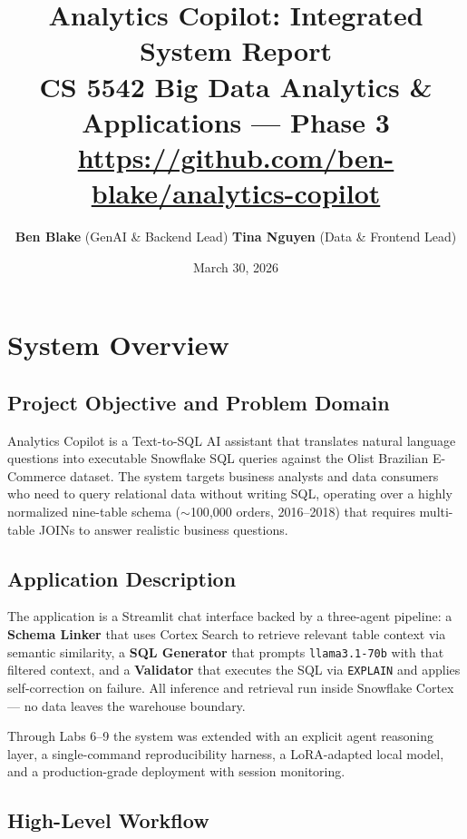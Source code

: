 \documentclass[11pt,letterpaper]{article}
\title{\vspace{-1.2cm}\textbf{Analytics Copilot: Integrated System Report}\\[3pt]
\large CS 5542 Big Data Analytics \& Applications --- Phase 3\\[2pt]
\normalsize \url{https://github.com/ben-blake/analytics-copilot}}
\author{\textbf{Ben Blake} (GenAI \& Backend Lead) \quad
\textbf{Tina Nguyen} (Data \& Frontend Lead)}
\date{March 30, 2026}
\begin{document}
\maketitle
\vspace{-0.6cm}

\section{System Overview}

\subsection{Project Objective and Problem Domain}

Analytics Copilot is a Text-to-SQL AI assistant that translates natural language questions into executable Snowflake SQL queries against the Olist Brazilian E-Commerce dataset. The system targets business analysts and data consumers who need to query relational data without writing SQL, operating over a highly normalized nine-table schema ($\sim$100{,}000 orders, 2016--2018) that requires multi-table JOINs to answer realistic business questions.

\subsection{Application Description}

The application is a Streamlit chat interface backed by a three-agent pipeline: a \textbf{Schema Linker} that uses Cortex Search to retrieve relevant table context via semantic similarity, a \textbf{SQL Generator} that prompts \texttt{llama3.1-70b} with that filtered context, and a \textbf{Validator} that executes the SQL via \texttt{EXPLAIN} and applies self-correction on failure. All inference and retrieval run inside Snowflake Cortex --- no data leaves the warehouse boundary.

Through Labs 6--9 the system was extended with an explicit agent reasoning layer, a single-command reproducibility harness, a LoRA-adapted local model, and a production-grade deployment with session monitoring.

\subsection{High-Level Workflow}
\end{document}

